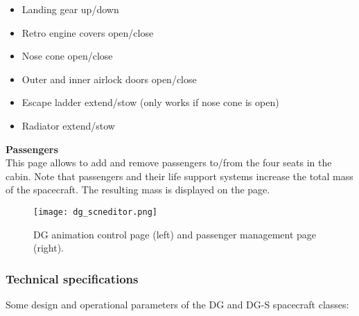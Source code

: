 \documentclass[Orbiter User Manual.tex]{subfiles}
\begin{document}
\begin{itemize} 
\item Landing gear up/down
\item Retro engine covers open/close
\item Nose cone open/close
\item Outer and inner airlock doors open/close
\item Escape ladder extend/stow (only works if nose cone is open)
\item Radiator extend/stow
\end{itemize}

\noindent
\textbf{Passengers}\\
This page allows to add and remove passengers to/from the four seats in the cabin. Note that passengers and their life support systems increase the total mass of the spacecraft. The resulting mass is displayed on the page. 

\begin{figure}[H]
  \centering
  \texttt{[image: dg\_scneditor.png]}
  \caption{DG animation control page (left) and passenger management page (right).}
\end{figure}


\subsubsection{Technical specifications}
Some design and operational parameters of the DG and DG-S spacecraft classes:
\end{document}
